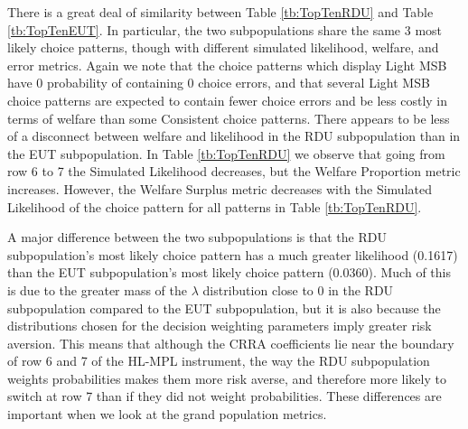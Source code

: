 \documentclass[../main.tex]{subfiles}
\begin{document}
There is a great deal of similarity between Table \ref{tb:TopTenRDU} and Table \ref{tb:TopTenEUT}.
In particular, the two subpopulations share the same $3$ most likely choice patterns, though with different simulated likelihood, welfare, and error metrics.
Again we note that the choice patterns which display Light MSB have $0$ probability of containing $0$ choice errors, and that several Light MSB choice patterns are expected to contain fewer choice errors and be less costly in terms of welfare than some Consistent choice patterns.
There appears to be less of a disconnect between welfare and likelihood in the RDU subpopulation than in the EUT subpopulation. 
In Table \ref{tb:TopTenRDU} we observe that going from row 6 to 7 the Simulated Likelihood decreases, but the Welfare Proportion metric increases.
However, the Welfare Surplus metric decreases with the Simulated Likelihood of the choice pattern for all patterns in Table \ref{tb:TopTenRDU}.

A major difference between the two subpopulations is that the RDU subpopulation's most likely choice pattern has a much greater likelihood (0.1617) than the EUT subpopulation's most likely choice pattern (0.0360).
Much of this is due to the greater mass of the $\lambda$ distribution close to $0$ in the RDU subpopulation compared to the EUT subpopulation, but it is also because the distributions chosen for the decision weighting parameters imply greater risk aversion.
This means that although the CRRA coefficients lie near the boundary of row 6 and 7 of the HL-MPL instrument, the way the RDU subpopulation weights probabilities makes them more risk averse, and therefore more likely to switch at row 7 than if they did not weight probabilities.
These differences are important when we look at the grand population metrics.
\end{document}
